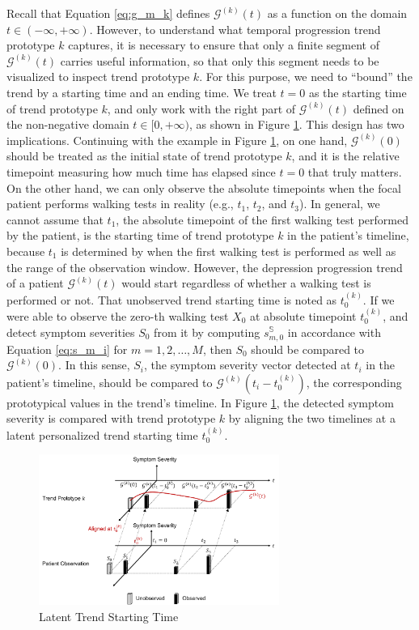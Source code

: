 \documentclass[mnsc]{informs3b} %
\begin{document}
Recall that Equation \ref{eq:g_m_k} defines $\mathcal{G}^{(k)}(t)$ as a function on the domain $t \in (-\infty, +\infty)$. However, to understand what temporal progression trend prototype $k$ captures, it is necessary to ensure that only a finite segment of $\mathcal{G}^{(k)}(t)$ carries useful information, so that only this segment needs to be visualized to inspect trend prototype $k$. For this purpose, we need to ``bound'' the trend by a starting time and an ending time.
We treat $t=0$ as the starting time of trend prototype $k$, and only work with the right part of $\mathcal{G}^{(k)}(t)$ defined on the non-negative domain $t \in [0, +\infty)$, as shown in Figure \ref{fig:trend_patient}. This design has two implications. Continuing with the example in Figure \ref{fig:trend_patient}, on one hand, $\mathcal{G}^{(k)}(0)$ should be treated as the initial state of trend prototype $k$, and it is the relative timepoint measuring how much time has elapsed since $t=0$ that truly matters. On the other hand, we can only observe the absolute timepoints when the focal patient performs walking tests in reality (e.g., $t_1$, $t_2$, and $t_3$). In general, we cannot assume that $t_1$, the absolute timepoint of the first walking test performed by the patient, is the starting time of trend prototype $k$ in the patient's timeline, because $t_1$ is determined by when the first walking test is performed as well as the range of the observation window. However, the depression progression trend of a patient $\mathcal{G}^{(k)}(t)$ would start regardless of whether a walking test is performed or not. That unobserved trend starting time is noted as $t_0^{(k)}$.
If we were able to observe the zero-th walking test $X_0$ at absolute timepoint $t_0^{(k)}$, and detect symptom severities $S_0$ from it by computing $s_{m,0}^{\mathbb{S}}$ in accordance with Equation \ref{eq:s_m_i} for $m=1,2,\dots,M$, then $S_0$ should be compared to $\mathcal{G}^{(k)}(0)$. 
In this sense, $S_i$, the symptom severity vector detected at $t_i$ in the patient's timeline, should be compared to $\mathcal{G}^{(k)}(t_i-t_0^{(k)})$, the corresponding prototypical values in the trend's timeline.
In Figure \ref{fig:trend_patient}, the detected symptom severity is compared with trend prototype $k$ by aligning the two timelines at a latent personalized trend starting time $t_0^{(k)}$. 

\begin{figure}[h]
    \centering
    \includegraphics[width=0.7\textwidth]{imgs/trend_patient.pdf}
    \caption{Latent Trend Starting Time}
    \label{fig:trend_patient}
\end{figure}
\end{document}
